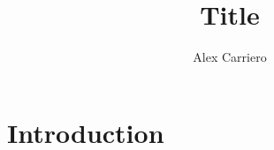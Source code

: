 \documentclass[AMA,STIX1COL,]{WileyNJD-v2}
\begin{document}
\title{Title}

\author[a,b]{Alex Carriero}


\address[a]{Department of Methodology and Statistics, Utrecht
Univeristy, Utrecht, The Netherlands}
\address[b]{Julius Center for Health Sciences and Primary Care,
University Medical Center Utrecht, Utrecht, The Netherlands}





\maketitle

\hypertarget{introduction}{%
\section{Introduction}\label{introduction}}
\end{document}
